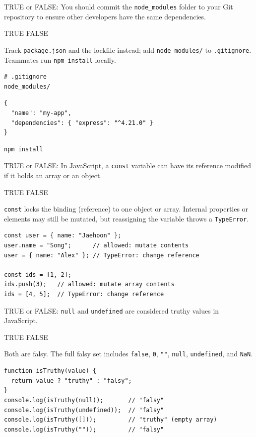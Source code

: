 \question[4]
TRUE or FALSE: You should commit the \lstinline[style=jsinline]|node_modules| folder to your Git repository to ensure other developers have the same dependencies.
\begin{choices}
  \choice TRUE
  \CorrectChoice FALSE
\end{choices}
\begin{solution}
  Track \lstinline[style=jsinline]|package.json| and the lockfile instead; add \lstinline[style=jsinline]|node_modules/| to \lstinline[style=bashinline]|.gitignore|. Teammates run \lstinline[style=bashinline]|npm install| locally.
\begin{lstlisting}[style=bash]
# .gitignore
node_modules/
\end{lstlisting}
\begin{lstlisting}[style=json]
{
  "name": "my-app",
  "dependencies": { "express": "^4.21.0" }
}
\end{lstlisting}
\begin{lstlisting}[style=bash]
npm install
\end{lstlisting}
\end{solution}

\question[4]
TRUE or FALSE: In JavaScript, a \lstinline[style=jsinline]|const| variable can have its reference modified if it holds an array or an object.
\begin{choices}
  \choice TRUE
  \CorrectChoice FALSE
\end{choices}
\begin{solution}
  \lstinline[style=jsinline]|const| locks the binding (reference) to one object or array. Internal properties or elements may still be mutated, but reassigning the variable throws a \texttt{TypeError}.
\begin{lstlisting}[style=js]
const user = { name: "Jaehoon" };
user.name = "Song";      // allowed: mutate contents
user = { name: "Alex" }; // TypeError: change reference

const ids = [1, 2];
ids.push(3);   // allowed: mutate array contents
ids = [4, 5];  // TypeError: change reference
\end{lstlisting}
\end{solution}

\question[4]
TRUE or FALSE: \lstinline[style=jsinline]|null| and \lstinline[style=jsinline]|undefined| are considered truthy values in JavaScript.
\begin{choices}
  \choice TRUE
  \CorrectChoice FALSE
\end{choices}
\begin{solution}
  Both are falsy. The full falsy set includes \lstinline[style=jsinline]|false|, \lstinline[style=jsinline]|0|, \lstinline[style=jsinline]|""|, \lstinline[style=jsinline]|null|, \lstinline[style=jsinline]|undefined|, and \lstinline[style=jsinline]|NaN|.
\begin{lstlisting}[style=js]
function isTruthy(value) {
  return value ? "truthy" : "falsy";
}
console.log(isTruthy(null));       // "falsy"
console.log(isTruthy(undefined));  // "falsy"
console.log(isTruthy([]));         // "truthy" (empty array)
console.log(isTruthy(""));         // "falsy"
\end{lstlisting}
\end{solution}

